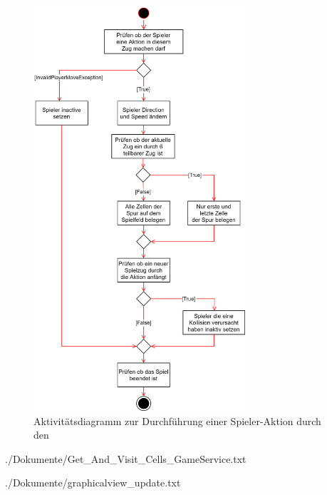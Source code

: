 \begin{figure}[htb]
	\centering
	\includegraphics[width=0.7\textwidth]{Bilder/game_service_do_action_activity_diagram.png}
	\caption{Aktivitätsdiagramm zur Durchführung einer Spieler-Aktion durch den }
	\label{fig:aktivitaetsdiagramm-spieleraktion-gameservice}
\end{figure}

\begin{minipage}{\textwidth}
	
	{./Dokumente/Get_And_Visit_Cells_GameService.txt}
\end{minipage}

\begin{minipage}{\textwidth}
	
	{./Dokumente/graphicalview_update.txt}
\end{minipage}

